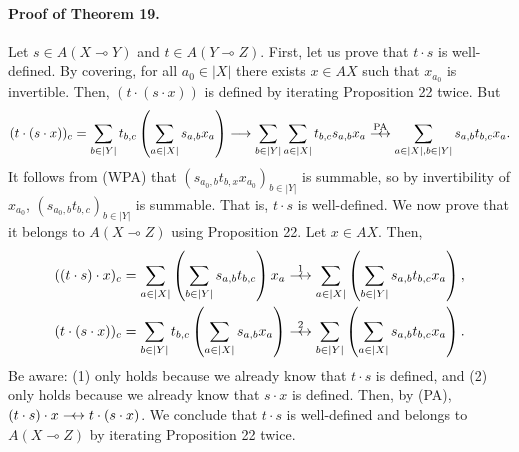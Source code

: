 \documentclass[10pt,a4paper]{article}
\newcommand{\lolli}{\multimap}
\newcommand{\dimp}{\mathrel{\relbar\joinrel\rightarrow}}
\newcommand{\dequiv}{\mathrel{\relbar\joinrel\leftrightarrow}}
\begin{document}
\paragraph{Proof of Theorem 19.} Let $s\in A(X\lolli Y)$ and $t\in A(Y\lolli Z)$. First, let us prove that $t\cdot s$ is well-defined. By covering, for all $a_0\in|X|$ there exists $x\in AX$ such that $x_{a_0}$ is invertible. Then, $(t\cdot(s\cdot x))$ is defined by iterating Proposition 22 twice. But
\[(t\cdot(s\cdot x))_c=\sum_{b\in|Y|}t_{b,c}\left(\sum_{a\in|X|}s_{a,b}x_a\right)\dimp\sum_{b\in|Y|}\sum_{a\in|X|}t_{b,c}s_{a,b}x_a\mathrel{\stackrel{\mathrm{PA}}{\dequiv}}\sum_{a\in|X|,b\in|Y|}s_{a,b}t_{b,c}x_a.\]
It follows from (WPA) that $(s_{a_0,b}t_{b,x}x_{a_0})_{b\in|Y|}$ is summable, so by invertibility of $x_{a_0}$, $(s_{a_0,b}t_{b,c})_{b\in|Y|}$ is summable. That is, $t\cdot s$ is well-defined. We now prove that it belongs to $A(X\lolli Z)$ using Proposition 22. Let $x\in AX$. Then,
\begin{align*}((t\cdot s)\cdot x)_c&=\sum_{a\in|X|}\left(\sum_{b\in|Y|}s_{a,b}t_{b,c}\right)x_a\mathrel{\stackrel{1}{\dequiv}}\sum_{a\in|X|}\left(\sum_{b\in|Y|}s_{a,b}t_{b,c}x_a\right),\\(t\cdot(s\cdot x))_c&=\sum_{b\in|Y|}t_{b,c}\left(\sum_{a\in|X|}s_{a,b}x_a\right)\mathrel{\stackrel{2}{\dequiv}}\sum_{b\in|Y|}\left(\sum_{a\in|X|}s_{a,b}t_{b,c}x_a\right).\end{align*}
Be aware: (1) only holds because we already know that $t\cdot s$ is defined, and (2) only holds because we already know that $s\cdot x$ is defined. Then, by (PA), $(t\cdot s)\cdot x\dequiv t\cdot(s\cdot x)$. We conclude that $t\cdot s$ is well-defined and belongs to $A(X\lolli Z)$ by iterating Proposition 22 twice.
\end{document}

